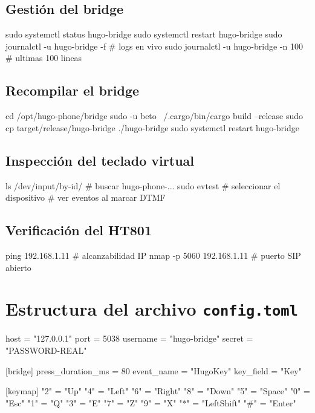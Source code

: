 \subsection{Gestión del bridge}

\begin{shellcode}
sudo systemctl status hugo-bridge
sudo systemctl restart hugo-bridge
sudo journalctl -u hugo-bridge -f      # logs en vivo
sudo journalctl -u hugo-bridge -n 100  # ultimas 100 lineas
\end{shellcode}

\subsection{Recompilar el bridge}

\begin{shellcode}
cd /opt/hugo-phone/bridge
sudo -u beto ~/.cargo/bin/cargo build --release
sudo cp target/release/hugo-bridge ./hugo-bridge
sudo systemctl restart hugo-bridge
\end{shellcode}

\subsection{Inspección del teclado virtual}

\begin{shellcode}
ls /dev/input/by-id/                   # buscar hugo-phone-...
sudo evtest                            # seleccionar el dispositivo
                                       # ver eventos al marcar DTMF
\end{shellcode}

\subsection{Verificación del HT801}

\begin{shellcode}
ping 192.168.1.11                      # alcanzabilidad IP
nmap -p 5060 192.168.1.11              # puerto SIP abierto
\end{shellcode}

\section{Estructura del archivo \texttt{config.toml}}

\begin{tomlcode}
[ami]
host = "127.0.0.1"
port = 5038
username = "hugo-bridge"
secret = "PASSWORD-REAL"

[bridge]
press_duration_ms = 80
event_name = "HugoKey"
key_field = "Key"

[keymap]
"2" = "Up"
"4" = "Left"
"6" = "Right"
"8" = "Down"
"5" = "Space"
"0" = "Esc"
"1" = "Q"
"3" = "E"
"7" = "Z"
"9" = "X"
"*" = "LeftShift"
"#" = "Enter"
\end{tomlcode}

